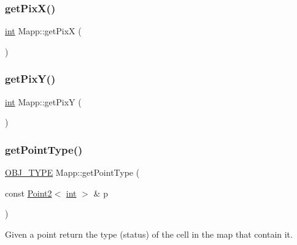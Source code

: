 \mbox{\label{class_mapp_a6fc7ef7c8e9f057938c560ff910d641d}} 
\subsubsection{\texorpdfstring{getPixX()}{getPixX()}}
{\footnotesize\ttfamily \mbox{\hyperlink{draw_8hh_aa620a13339ac3a1177c86edc549fda9b}{int}} Mapp\+::get\+PixX (\begin{DoxyParamCaption}{ }\end{DoxyParamCaption})\hspace{0.3cm}{\ttfamily [inline]}}

\mbox{\label{class_mapp_aebab0273b130d6c156bad06249e05bf9}} 
\subsubsection{\texorpdfstring{getPixY()}{getPixY()}}
{\footnotesize\ttfamily \mbox{\hyperlink{draw_8hh_aa620a13339ac3a1177c86edc549fda9b}{int}} Mapp\+::get\+PixY (\begin{DoxyParamCaption}{ }\end{DoxyParamCaption})\hspace{0.3cm}{\ttfamily [inline]}}

\mbox{\label{class_mapp_ac6341641bd67502eef7c025cb4cd1c71}} 
\subsubsection{\texorpdfstring{getPointType()}{getPointType()}}
{\footnotesize\ttfamily \mbox{\hyperlink{map_8hh_a714b9c2c276fbae637fee36453d9121e}{O\+B\+J\+\_\+\+T\+Y\+PE}} Mapp\+::get\+Point\+Type (\begin{DoxyParamCaption}\item[{const \mbox{\hyperlink{class_point2}{Point2}}$<$ \mbox{\hyperlink{draw_8hh_aa620a13339ac3a1177c86edc549fda9b}{int}} $>$ \&}]{p }\end{DoxyParamCaption})}



Given a point return the type (status) of the cell in the map that contain it. 


